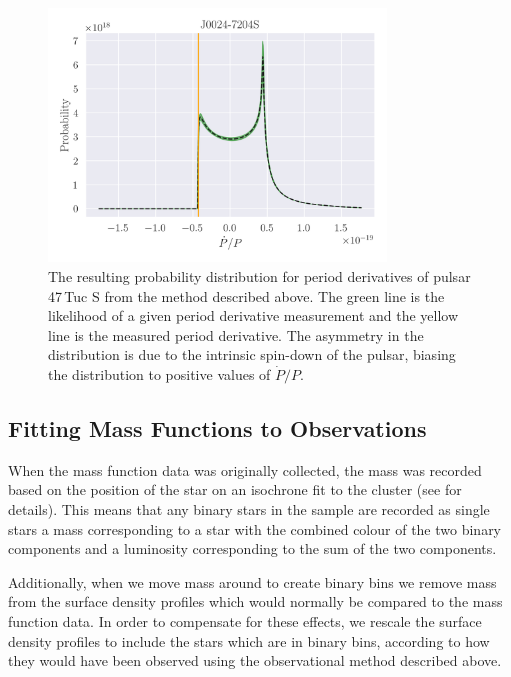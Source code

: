 \begin{figure}
    \centering
    \includegraphics[width=0.8\textwidth]{figures/pulsar-likelihood.png}
    \caption{The resulting probability distribution for period derivatives of pulsar 47\,Tuc S from
        the method described above. The green line is the likelihood of a given period
        derivative measurement and the yellow line is the measured period derivative. The asymmetry in
        the distribution is due to the intrinsic spin-down of the pulsar, biasing the distribution to
        positive values of $\dot{P}/P$.}
    \label{fig:pulsar-likelihood}
\end{figure}




\subsection{Fitting Mass Functions to Observations}

When the mass function data was originally collected, the mass was recorded based on the position of
the star on an isochrone fit to the cluster (see \citealt{Sollima2017} for details). This means that
any binary stars in the sample are recorded as single stars a mass corresponding to a star with the
combined colour of the two binary components and a luminosity corresponding to the sum of the two
components.

Additionally, when we move mass around to create binary bins we remove mass from the surface density
profiles which would normally be compared to the mass function data. In order to compensate for
these effects, we rescale the surface density profiles to include the stars which are in binary
bins, according to how they would have been observed using the observational method described above.

